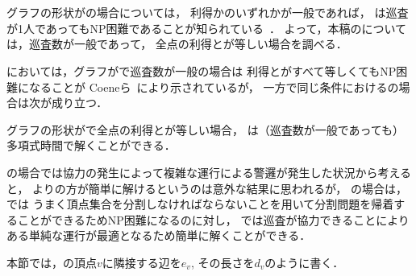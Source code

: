 \section{{\graphStar}}
\label{section: star}

グラフの形状が{\graphStar}の場合については，
利得か{\maxIdletime}のいずれかが一般であれば，
{\patProb}は巡査が1人であってもNP困難であることが知られている~\cite{coene2011charlemagne}．
よって，本稿の{\patProb}については，巡査数が一般であって，
全点の利得と{\maxIdletime}が等しい場合を調べる．

{\independentPatProb}においては，グラフが{\graphStar}で巡査数が一般の場合は
利得と{\maxIdletime}がすべて等しくてもNP困難になることが
Coeneら~\cite{coene2011charlemagne}により示されているが，
一方で同じ条件における{\patProb}の場合は次が成り立つ．

\begin{theo}
\label{theo:StarEqualProfitTimelimit}
グラフの形状が{\graphStar}で全点の利得と{\maxIdletime}が等しい場合，
{\patProb}は（巡査数が一般であっても）多項式時間で解くことができる．
\end{theo}

{\graphLine}の場合では協力の発生によって複雑な運行による警邏が発生した状況から考えると，
{\independentPatProb}より{\patProb}の方が簡単に解けるというのは意外な結果に思われるが，
{\graphStar}の場合は，{\independentPatProb}では
うまく頂点集合を分割しなければならないことを用いて分割問題を帰着することができるためNP困難になるのに対し，
{\patProb}では巡査が協力できることによりある単純な運行が最適となるため簡単に解くことができる．

本節では，{\graphStar}の頂点$v$に隣接する辺を$e_v$, その長さを$d_v$のように書く．

